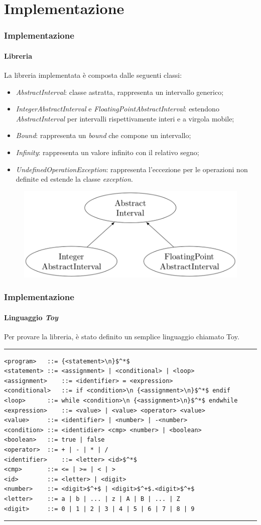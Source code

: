 \documentclass{beamer}
\begin{document}
\section{Implementazione}
	\begin{frame}[fragile]
		\frametitle{Implementazione}
		\framesubtitle{Libreria}
		La libreria implementata è composta dalle seguenti classi:
		\begin{itemize}
			\item \alert{\textit{AbstractInterval}}: classe astratta, rappresenta un intervallo generico;
			\item \alert{\textit{IntegerAbstractInterval}} e \alert{\textit{FloatingPointAbstractInterval}}: estendono \textit{AbstractInterval} per intervalli rispettivamente interi e a virgola mobile;
			\item \alert{\textit{Bound}}: rappresenta un \textit{bound} che compone un intervallo;
			\item \alert{\textit{Infinity}}: rappresenta un valore infinito con il relativo segno;
			\item \alert{\textit{UndefinedOperationException}}: rappresenta l'eccezione per le operazioni non definite ed estende la classe \textit{exception}.
		\end{itemize}
	\begin{figure}[H]
		\centering
		\includegraphics[scale=0.36]{pic}
	\end{figure}
\end{frame}


	\begin{frame}[fragile]			
		\frametitle{Implementazione}
		\framesubtitle{Linguaggio \textit{Toy}}
		Per provare la libreria, è stato definito un semplice linguaggio chiamato \alert{Toy}.\\
		\scriptsize
		\bigskip
		\hrule
\begin{lstlisting}
<program>	::= {<statement>\n}$^*$
<statement>	::= <assignment> | <conditional> | <loop>
<assignment>	::= <identifier> = <expression>
<conditional>	::= if <condition>\n {<assignment>\n}$^*$ endif
<loop>		::= while <condition>\n {<assignment>\n}$^*$ endwhile 
<expression>	::= <value> | <value> <operator> <value>
<value>		::= <identifier> | <number> | -<number>
<condition>	::= <identidier> <cmp> <number> | <boolean>
<boolean>	::= true | false
<operator>	::= + | - | * | / 
<identifier>	::= <letter> <id>$^*$
<cmp>		::= <= | >= | < | >
<id>		::= <letter> | <digit>
<number>	::= <digit>$^+$ | <digit>$^+$.<digit>$^+$
<letter>	::= a | b | ... | z | A | B | ... | Z
<digit>		::= 0 | 1 | 2 | 3 | 4 | 5 | 6 | 7 | 8 | 9
\end{lstlisting}
\hrule
\normalsize
\end{frame}
\end{document}
